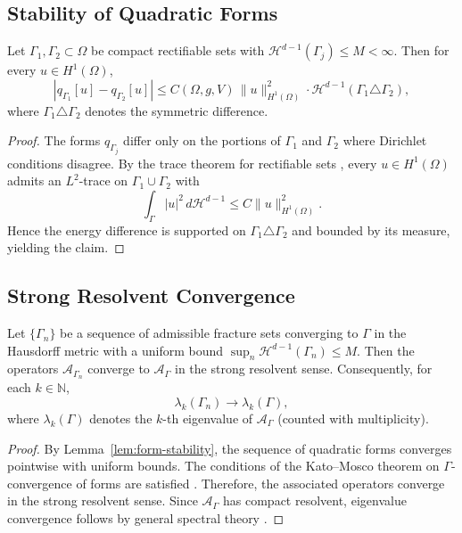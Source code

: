 \subsection{Stability of Quadratic Forms}
\begin{lemma}
\label{lem:form-stability}
Let $\Gamma_1,\Gamma_2\subset \Omega$ be compact rectifiable sets with
$\mathcal{H}^{d-1}(\Gamma_j)\leq M<\infty$. Then for every
$u \in H^1(\Omega)$,
\[
|q_{\Gamma_1}[u]-q_{\Gamma_2}[u]|
  \leq C(\Omega,g,V)\, \|u\|_{H^1(\Omega)}^2
   \cdot \mathcal{H}^{d-1}(\Gamma_1 \triangle \Gamma_2),
\]
where $\Gamma_1\triangle \Gamma_2$ denotes the symmetric difference.
\end{lemma}

\begin{proof}
The forms $q_{\Gamma_j}$ differ only on the portions of $\Gamma_1$ and
$\Gamma_2$ where Dirichlet conditions disagree. By the trace theorem for
rectifiable sets \cite{EvansGariepy2015}, every $u\in H^1(\Omega)$ admits an
$L^2$-trace on $\Gamma_1\cup \Gamma_2$ with
\[
\int_{\Gamma} |u|^2\, d\mathcal{H}^{d-1}
  \leq C \|u\|_{H^1(\Omega)}^2.
\]
Hence the energy difference is supported on $\Gamma_1\triangle \Gamma_2$ and
bounded by its measure, yielding the claim.
\end{proof}

\subsection{Strong Resolvent Convergence}
\begin{theorem}
\label{thm:spectral-stability}
Let $\{\Gamma_n\}$ be a sequence of admissible fracture sets converging to
$\Gamma$ in the Hausdorff metric with a uniform bound
$\sup_n \mathcal{H}^{d-1}(\Gamma_n)\leq M$. Then the operators
$\mathcal{A}_{\Gamma_n}$ converge to $\mathcal{A}_\Gamma$ in the strong
resolvent sense. Consequently, for each $k\in\mathbb{N}$,
\[
\lambda_k(\Gamma_n)\to \lambda_k(\Gamma),
\]
where $\lambda_k(\Gamma)$ denotes the $k$-th eigenvalue of $\mathcal{A}_\Gamma$
(counted with multiplicity).
\end{theorem}

\begin{proof}
By Lemma~\ref{lem:form-stability}, the sequence of quadratic forms converges
pointwise with uniform bounds. The conditions of the Kato--Mosco theorem on
$\Gamma$-convergence of forms are satisfied
\cite{DalMaso1993,Kato1995,Braides2002}. Therefore, the associated operators
converge in the strong resolvent sense. Since $\mathcal{A}_\Gamma$ has compact
resolvent, eigenvalue convergence follows by general spectral theory
\cite{ReedSimon1980}.
\end{proof}

